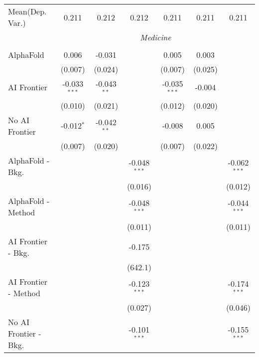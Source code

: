\begin{tabular}{lcccccc}
Mean(Dep. Var.) & 0.211 & 0.212 & 0.212 & 0.211 & 0.211 & 0.211 \\
 & \multicolumn{6}{c}{\textit{Medicine}} \\ \\
   AlphaFold               & 0.006          & -0.031        &                & 0.005          & 0.003   &   \\   
                           & (0.007)        & (0.024)       &                & (0.007)        & (0.025) &   \\   
   AI Frontier             & -0.033$^{***}$ & -0.043$^{**}$ &                & -0.035$^{***}$ & -0.004  &   \\   
                           & (0.010)        & (0.021)       &                & (0.012)        & (0.020) &   \\   
   No AI Frontier          & -0.012$^{*}$   & -0.042$^{**}$ &                & -0.008         & 0.005   &   \\   
                           & (0.007)        & (0.020)       &                & (0.007)        & (0.022) &   \\   
   AlphaFold - Bkg.        &                &               & -0.048$^{***}$ &                &         & -0.062$^{***}$\\   
                           &                &               & (0.016)        &                &         & (0.012)\\   
   AlphaFold - Method      &                &               & -0.048$^{***}$ &                &         & -0.044$^{***}$\\   
                           &                &               & (0.011)        &                &         & (0.011)\\   
   AI Frontier - Bkg.      &                &               & -0.175         &                &         &   \\   
                           &                &               & (642.1)        &                &         &   \\   
   AI Frontier - Method    &                &               & -0.123$^{***}$ &                &         & -0.174$^{***}$\\   
                           &                &               & (0.027)        &                &         & (0.046)\\   
   No AI Frontier - Bkg.   &                &               & -0.101$^{***}$ &                &         & -0.155$^{***}$\\   

\end{tabular}
